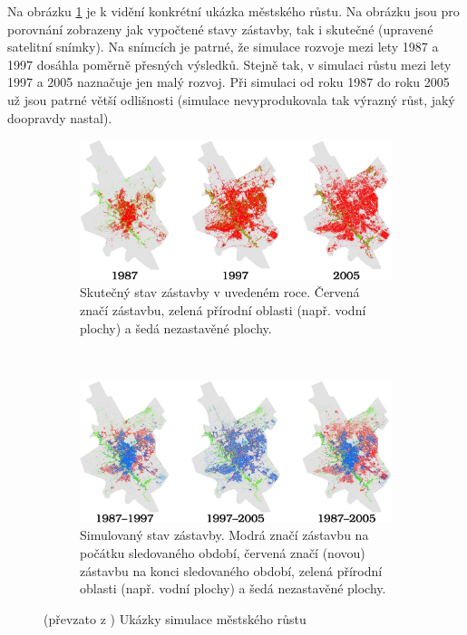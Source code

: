 \documentclass[a4paper,10pt]{article}
\begin{document}
Na obrázku \ref{img-UrbGroProSample} je k vidění konkrétní ukázka městského růstu. Na obrázku jsou pro porovnání zobrazeny jak vypočtené stavy zástavby, tak i skutečné (upravené satelitní snímky). Na snímcích je patrné, že simulace rozvoje mezi lety 1987 a 1997 dosáhla poměrně přesných výsledků. Stejně tak, v simulaci růstu mezi lety 1997 a 2005 naznačuje jen malý rozvoj. Při simulaci od roku 1987 do roku 2005 už jsou patrné větší odlišnosti (simulace nevyprodukovala tak výrazný růst, jaký doopravdy nastal).

\begin{figure}[]
    \begin{subfigure}[t]{\textwidth} \centering
      \includegraphics[width=\textwidth]{urban-growt-city-1}
      \caption{Skutečný stav zástavby v uvedeném roce. Červená značí zástavbu, zelená přírodní oblasti (např. vodní plochy) a šedá nezastavěné plochy.} 
    \end{subfigure}
    \\
    \begin{subfigure}[t]{\textwidth} \centering
      \includegraphics[width=\textwidth]{urban-growt-city-2}
      \caption{Simulovaný stav zástavby. Modrá značí zástavbu na počátku sledovaného období, červená značí (novou) zástavbu na konci sledovaného období, zelená přírodní oblasti (např. vodní plochy) a šedá nezastavěné plochy.} 
    \end{subfigure}

    \caption[Ukázky simulace městského růstu]{(převzato z \cite{Ahm+-CalFuzCelAutModUrbDynSauAr}) Ukázky simulace městského růstu} \label{img-UrbGroProSample}
\end{figure}
\end{document}

